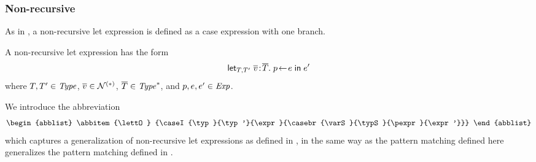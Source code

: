 \subsubsection{Non-recursive}

As in \cite{lm}, a non-recursive let expression is defined as a case
expression with one branch.

A non-recursive let expression has the form
\[
\mathsf{let}_{T,T'}\;\overline{v}\!:\!\overline{T}.\;p\!\gets\!e\;\mathsf{in}\;e'
\]
where $T,T'\in\mathit{Type}$, $\overline{v}\in\mathcal{N}^{(\ast)}$, $\overline{T}\in\mathit{Type}^\ast$, and
$p,e,e'\in\mathit{Exp}$.

We introduce the abbreviation
\[
\begin{abblist}
\abbitem{\lettO}
        {\caseI{\typ}{\typ'}{\expr}{\casebr{\varS}{\typS}{\pexpr}{\expr'}}}
\end{abblist}
\]
which captures a generalization of non-recursive let expressions as defined in
\cite{lm}, in the same way as the pattern matching defined here generalizes
the pattern matching defined in \cite{lm}.






